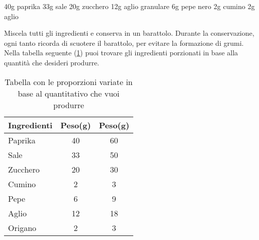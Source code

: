 \label{rub:magic-dust}
\serves{-}
\cooktime{-}
\begin{ingreds}
	40g paprika
	33g sale
	20g zucchero
	12g aglio granulare
	6g pepe nero
	2g cumino
	2g aglio

\end{ingreds}

\begin{method}
	Miscela tutti gli ingredienti e conserva in un barattolo. Durante la conservazione, ogni tanto ricorda di scuotere il barattolo, per evitare la formazione di grumi. Nella tabella seguente (\ref{magicdust-proporzioni}) puoi trovare gli ingredienti porzionati in base alla quantità che desideri produrre.
	\begin{table}[h]
	\begin{center}
\begin{tabular}{lcc}
\toprule
	Ingredienti	&	Peso(g)	&	Peso(g)\\
\midrule
	Paprika		&	40	&	60	\\
	Sale		&	33	&	50	\\
	Zucchero	&	20	&	30	\\
	Cumino		&	2	&	3	\\
	Pepe		&	6	&	9	\\
	Aglio		&	12	&	18	\\
	Origano		&	2	&	3	\\
\bottomrule
\end{tabular}
	\caption{Tabella con le proporzioni variate in base al quantitativo che vuoi produrre}
		\label{magicdust-proporzioni}
	\end{center}
\end{table}
\end{method}



